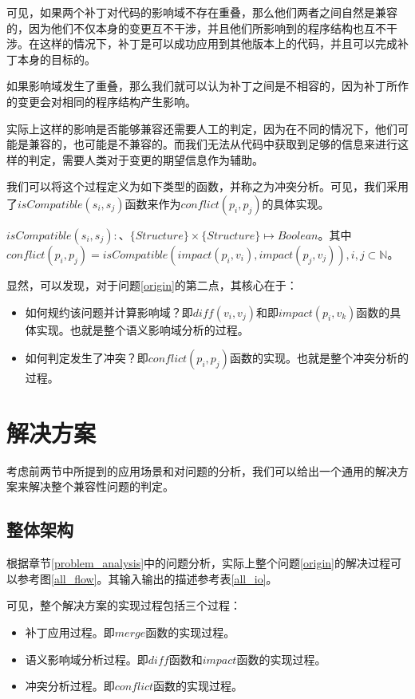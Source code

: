 可见，如果两个补丁对代码的影响域不存在重叠，那么他们两者之间自然是兼容的，因为他们不仅本身的变更互不干涉，并且他们所影响到的程序结构也互不干涉。在这样的情况下，补丁是可以成功应用到其他版本上的代码，并且可以完成补丁本身的目标的。

如果影响域发生了重叠，那么我们就可以认为补丁之间是不相容的，因为补丁所作的变更会对相同的程序结构产生影响。

实际上这样的影响是否能够兼容还需要人工的判定，因为在不同的情况下，他们可能是兼容的，也可能是不兼容的。而我们无法从代码中获取到足够的信息来进行这样的判定，需要人类对于变更的期望信息作为辅助。

我们可以将这个过程定义为如下类型的函数，并称之为冲突分析。可见，我们采用了$isCompatible(s_i,s_j)$函数来作为$conflict(p_i,p_j)$的具体实现。

\begin{definition}
	$isCompatible(s_i,s_j) : 、\{Structure\} \times \{Structure\} \mapsto Boolean$。其中$conflict(p_i,p_j) = isCompatible(impact(p_i,v_i),impact(p_j,v_j)),i,j \subset \mathbb{N}$。
\end{definition}

显然，可以发现，对于问题\ref {origin}的第二点，其核心在于：
\begin{itemize}
	\item 如何规约该问题并计算影响域？即$diff(v_i,v_j)$和即$impact(p_i,v_k)$函数的具体实现。也就是整个语义影响域分析的过程。
	\item 如何判定发生了冲突？即$conflict(p_i,p_j)$函数的实现。也就是整个冲突分析的过程。
\end{itemize}


\section{解决方案}
\label {problem_solve}

考虑前两节中所提到的应用场景和对问题的分析，我们可以给出一个通用的解决方案来解决整个兼容性问题的判定。

\subsection{整体架构}
\label {problem_all}

根据章节\ref {problem_analysis}中的问题分析，实际上整个问题\ref {origin}的解决过程可以参考图\ref {all_flow}。其输入输出的描述参考表\ref {all_io}。

可见，整个解决方案的实现过程包括三个过程：
\begin{itemize}
	\item 补丁应用过程。即$merge$函数的实现过程。
	\item 语义影响域分析过程。即$diff$函数和$impact$函数的实现过程。
	\item 冲突分析过程。即$conflict$函数的实现过程。
\end{itemize}

